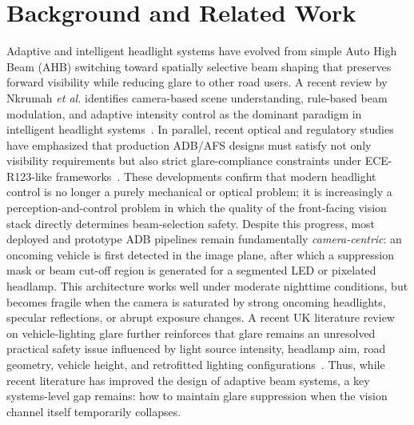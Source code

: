 \documentclass[pdflatex,sn-mathphys-num]{sn-jnl}%
\theoremstyle{thmstyleone}%
\theoremstyle{thmstyletwo}%
\theoremstyle{thmstylethree}%
\begin{document}
\section{Background and Related Work}
\label{sec:related}


Adaptive and intelligent headlight systems have evolved from simple Auto High Beam (AHB) switching toward spatially selective beam shaping that preserves forward visibility while reducing glare to other road users. A recent review by Nkrumah \emph{et al.} identifies camera-based scene understanding, rule-based beam modulation, and adaptive intensity
control as the dominant paradigm in intelligent headlight systems~\cite{nkrumah2024review}. In parallel, recent optical and regulatory studies have emphasized that production ADB/AFS designs must satisfy not only visibility requirements but also strict glare-compliance constraints under ECE-R123-like frameworks~\cite{shin2026optimization}. These developments confirm that modern headlight control is no longer a purely mechanical or optical problem; it is increasingly a perception-and-control problem in which the quality of the front-facing vision stack directly determines beam-selection safety.
Despite this progress, most deployed and prototype ADB pipelines remain
fundamentally \emph{camera-centric}: an oncoming vehicle is first detected
in the image plane, after which a suppression mask or beam cut-off region is generated for a segmented LED or pixelated headlamp. This architecture works well under moderate nighttime conditions, but becomes fragile when the camera is saturated by strong oncoming headlights, specular reflections, or abrupt exposure changes. A recent UK literature review on vehicle-lighting glare further reinforces that glare remains an unresolved practical safety issue influenced by light source intensity, headlamp aim, road geometry, vehicle height, and retrofitted lighting
configurations~\cite{beard2025glarelitreview}. Thus, while recent literature has improved the design of adaptive beam systems, a key systems-level gap remains: how to maintain glare suppression when the vision channel itself
temporarily collapses.

\end{document}
